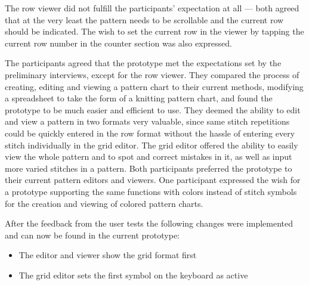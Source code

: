 The row viewer did not fulfill the participants' expectation at all --- both agreed that at the very least the pattern needs to be scrollable and the current row should be indicated. The wish to set the current row in the viewer by tapping the current row number in the counter section was also expressed.

The participants agreed that the prototype met the expectations set by the preliminary interviews, except for the row viewer. They compared the process of creating, editing and viewing a pattern chart to their current methods, modifying a spreadsheet to take the form of a knitting pattern chart, and found the prototype to be much easier and efficient to use. They deemed the ability to edit and view a pattern in two formats very valuable, since same stitch repetitions could be quickly entered in the row format without the hassle of entering every stitch individually in the grid editor. The grid editor offered the ability to easily view the whole pattern and to spot and correct mistakes in it, as well as input more varied stitches in a pattern. Both participants preferred the prototype to their current pattern editors and viewers. One participant expressed the wish for a prototype supporting the same functions with colors instead of stitch symbols for the creation and viewing of colored pattern charts.

After the feedback from the user tests the following changes were implemented and can now be found in the current prototype:

\begin{itemize}
	\item The editor and viewer show the grid format first
	\item The grid editor sets the first symbol on the keyboard as active
\end{itemize} 